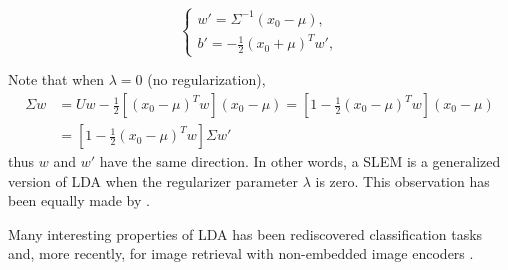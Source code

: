 \begin{equation}
\left\{\begin{array}{l}
\displaystyle w'=\Sigma^{-1}(x_0-\mu),\\
\displaystyle b'=-\frac{1}{2}(x_0+\mu)^T w',
\end{array}\right.
\label{eq:lda}
\end{equation}
 
Note that when $\lambda=0$ (no regularization),
\begin{align}
\Sigma w & = Uw -\frac{1}{2}[(x_0-\mu)^T w] (x_0-\mu) =
\left[1-\frac{1}{2}(x_0-\mu)^T w\right](x_0-\mu) \\
&=\left[1-\frac{1}{2}(x_0-\mu)^T w\right]\Sigma w'
\end{align}
thus $w$ and $w'$ have the same direction. In other words, a
SLEM is a generalized version of LDA when the
regularizer parameter $\lambda $ is zero.
This observation has been equally made by \cite{Koba15}.

Many interesting properties of LDA has been rediscovered classification tasks \cite{GMPD12,HMR12} and, more recently, for image retrieval with non-embedded image encoders \cite{babenko15}.




